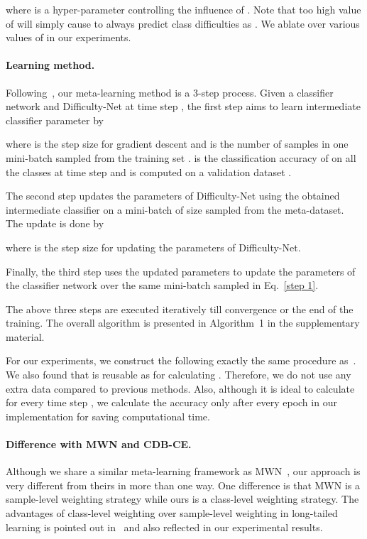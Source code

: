 \documentclass[10pt,twocolumn,letterpaper]{article}
\begin{document}
where  is a hyper-parameter controlling the influence of . Note that too high value of  will simply cause  to always predict class difficulties as 
.
We ablate over various values of  in our experiments.


\paragraph{Learning method.}

Following~\cite{meta-weight-net}, our meta-learning method is a 3-step process. Given a classifier network  and Difficulty-Net  at time step , the first step aims to learn 
intermediate classifier parameter  by

where  is the step size for gradient descent and  is the number of samples in one mini-batch sampled from the training set . 
 is the classification accuracy of  on all the  classes at time step  and is computed on a validation dataset . 

The second step updates the parameters  of Difficulty-Net using the obtained intermediate classifier  on a mini-batch of size  sampled from the meta-dataset. The update is done by

where  is the step size for updating the parameters of Difficulty-Net.

Finally, the third step uses the updated parameters  to update the parameters of the classifier network  over the same mini-batch sampled in Eq.~\ref{step 1}. 

The above three steps are executed iteratively till convergence or the end of the training. 
The overall algorithm is presented in 
Algorithm~1
in the supplementary material.


For our experiments, we construct the  following exactly the same procedure as~\cite{jamal,meta-weight-net}. We also found that  is reusable as  for calculating . Therefore, we do not use any extra data compared to previous methods.
Also, although it is ideal to calculate  for every time step , we calculate the accuracy only after every epoch in our implementation for saving computational time.







\paragraph{Difference with MWN and CDB-CE.}\label{sec: diff from mwn and cdb-ce}
Although we share a similar meta-learning framework as MWN~\cite{meta-weight-net}, our approach is very different from theirs in more than one way.
One difference is that MWN is a sample-level weighting strategy while ours is a class-level weighting strategy. 
The advantages of class-level weighting over sample-level weighting in long-tailed learning is pointed out in~\cite{cdb-ce} and also reflected in our experimental results. 
\end{document}
